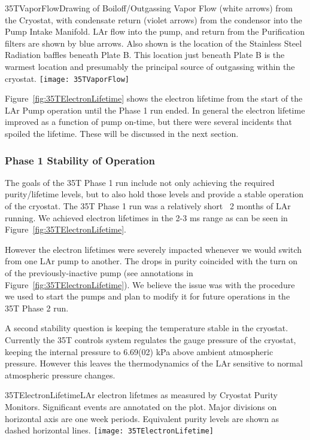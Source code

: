 \begin{cdrfigure}{35TVaporFlow}{Drawing of Boiloff/Outgassing Vapor Flow (white 
arrows) from the Cryostat, with condensate return (violet arrows) from the condensor into the Pump 
Intake Manifold. LAr flow into the pump, and return from the Purification filters are shown by blue 
arrows. Also shown is the location of the Stainless Steel Radiation baffles beneath Plate B. This location 
just beneath Plate B is the warmest location and presumably the principal source of outgassing within the 
cryostat.}
  \texttt{[image: 35TVaporFlow]}
\end{cdrfigure}

Figure~\ref{fig:35TElectronLifetime} shows the electron lifetime from the start of the LAr Pump operation until the Phase 1 run ended. In general the electron lifetime improved as a function of pump on-time, but there were several incidents that spoiled the lifetime. These will be discussed in the next section.

\subsubsection {Phase 1 Stability of Operation}

The goals of the 35T Phase 1 run include not only achieving the required purity/lifetime levels, but to 
also hold those levels and provide a stable operation of the cryostat. The 35T Phase 1 run was a relatively 
short  ~2 months of LAr running. We achieved electron lifetimes in the 2-3 ms range as can be seen in 
Figure~\ref{fig:35TElectronLifetime}.

However the electron lifetimes were severely impacted whenever we would switch from one LAr pump to 
another. The drops in purity coincided with the turn on of the previously-inactive pump (see annotations 
in Figure~\ref{fig:35TElectronLifetime}). We believe the issue was with the procedure we used to start the 
pumps and plan to modify it for future operations in the 35T Phase 2 run.

A second stability question is keeping the temperature stable in the cryostat. Currently the 35T controls 
system regulates the gauge pressure of the cryostat, keeping the internal pressure to 6.69(02) kPa above 
ambient atmospheric pressure. However this leaves the thermodynamics of the LAr sensitive to normal 
atmospheric pressure changes.

\begin{cdrfigure}{35TElectronLifetime}{LAr electron lifetmes as measured by 
Cryostat Purity Monitors. Significant events are annotated on the plot. Major divisions on horizontal axis 
are one week periods. Equivalent purity levels are shown as dashed horizontal lines.}
  \texttt{[image: 35TElectronLifetime]}
\end{cdrfigure}

